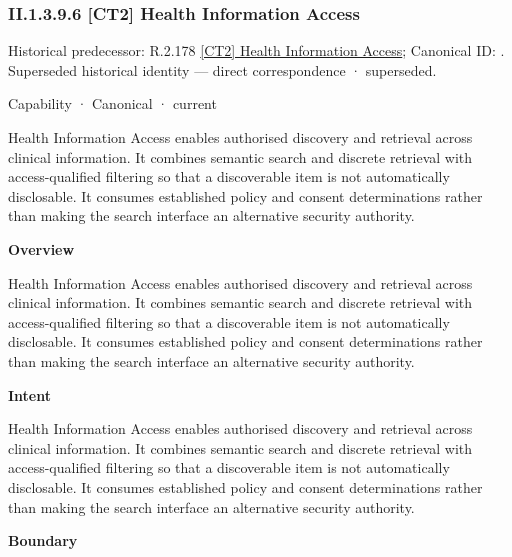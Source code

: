 \subsubsection*{II.1.3.9.6 [CT2] Health Information Access}
\label{navigation:II.1.3.9.6}

{\small Historical predecessor: R.2.178 \hyperref[element:5019ae9f2cdc45a1b2de97bc0f5a313d]{[CT2] Health Information Access}; Canonical ID: \texttt{}. Superseded historical identity — direct correspondence · superseded.}\par
\label{element:cc253aea3c5f489da0502df74dde1669}
{\small Capability · Canonical · current}\par

Health Information Access enables authorised discovery and retrieval across clinical information. It combines semantic search and discrete retrieval with access-qualified filtering so that a discoverable item is not automatically disclosable. It consumes established policy and consent determinations rather than making the search interface an alternative security authority.



\textbf{Overview}



Health Information Access enables authorised discovery and retrieval across clinical information. It combines semantic search and discrete retrieval with access-qualified filtering so that a discoverable item is not automatically disclosable. It consumes established policy and consent determinations rather than making the search interface an alternative security authority.



\textbf{Intent}



Health Information Access enables authorised discovery and retrieval across clinical information. It combines semantic search and discrete retrieval with access-qualified filtering so that a discoverable item is not automatically disclosable. It consumes established policy and consent determinations rather than making the search interface an alternative security authority.



\textbf{Boundary}



